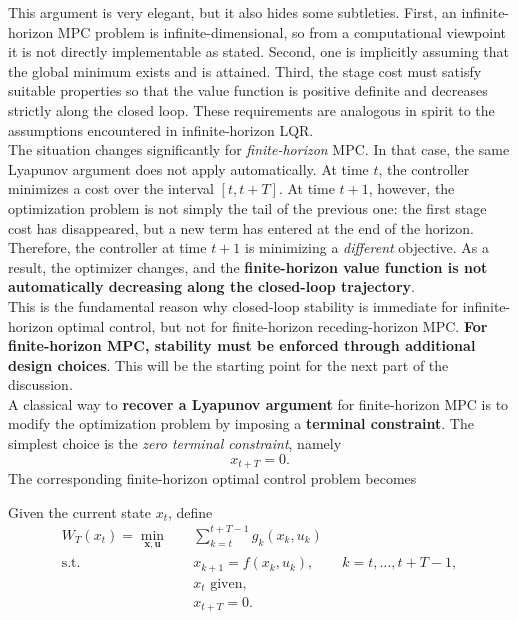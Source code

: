 This argument is very elegant, but it also hides some subtleties. First, an infinite-horizon MPC problem is infinite-dimensional, so from a computational viewpoint it is not directly implementable as stated. Second, one is implicitly assuming that the global minimum exists and is attained. Third, the stage cost must satisfy suitable properties so that the value function is positive definite and decreases strictly along the closed loop. These requirements are analogous in spirit to the assumptions encountered in infinite-horizon LQR.\\

The situation changes significantly for \emph{finite-horizon} MPC. In that case, the same Lyapunov argument does not apply automatically. At time $t$, the controller minimizes a cost over the interval $[t,t+T]$. At time $t+1$, however, the optimization problem is not simply the tail of the previous one: the first stage cost has disappeared, but a new term has entered at the end of the horizon. Therefore, the controller at time $t+1$ is minimizing a \emph{different} objective. As a result, the optimizer changes, and the \textbf{finite-horizon value function is not automatically decreasing along the closed-loop trajectory}.\\
This is the fundamental reason why closed-loop stability is immediate for infinite-horizon optimal control, but not for finite-horizon receding-horizon MPC. \textbf{For finite-horizon MPC, stability must be enforced through additional design choices}. This will be the starting point for the next part of the discussion.\\

A classical way to \textbf{recover a Lyapunov argument} for finite-horizon MPC is to modify the optimization problem by imposing a \textbf{terminal constraint}. The simplest choice is the \emph{zero terminal constraint}, namely
\[
x_{t+T}=0.
\]
The corresponding finite-horizon optimal control problem becomes
\begin{theorembox}
Given the current state $x_t$, define
\begin{align*}
W_T(x_t)= \min_{\mathbf{x},\mathbf{u}} \quad & \sum_{k=t}^{t+T-1} g_k(x_k,u_k) \\
\text{s.t.}\quad & x_{k+1}=f(x_k,u_k), \qquad k=t,\dots,t+T-1,\\
& x_t \text{ given},\\
& x_{t+T}=0.
\end{align*}
\end{theorembox}

